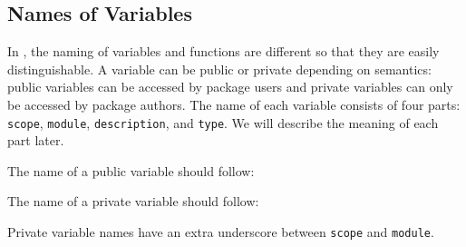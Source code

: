 \documentclass{ltugboat}
\begin{document}
\subsection{Names of Variables}\label{sec:name-of-variables}

In \LTT{}, the naming of variables and functions are different so that they are easily distinguishable. 
A \LTT{} variable can be public or private depending on semantics: public variables can be accessed by package users and private variables can only be accessed by package authors.
The name of each \LTT{} variable consists of four parts: \texttt{scope}, \texttt{module}, \texttt{description}, and \texttt{type}. 
We will describe the meaning of each part later.


\vspace*{0.5\baselineskip}
\par\noindent The name of a public variable should follow:
\begin{center}
\end{center}
The name of a private variable should follow:
\begin{center}
\end{center}
Private variable names have an extra underscore between \texttt{scope} and \texttt{module}.
\end{document}
